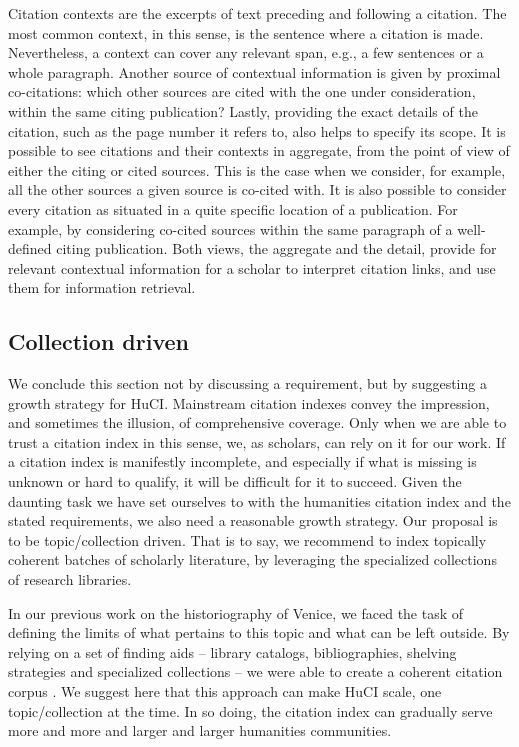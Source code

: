 Citation contexts are the excerpts of text preceding and following a citation. The most common context, in this sense, is the sentence where a citation is made. Nevertheless, a context can cover any relevant span, e.g., a few sentences or a whole paragraph. Another source of contextual information is given by proximal co-citations: which other sources are cited with the one under consideration, within the same citing publication? Lastly, providing the exact details of the citation, such as the page number it refers to, also helps to specify its scope. It is possible to see citations and their contexts in aggregate, from the point of view of either the citing or cited sources. This is the case when we consider, for example, all the other sources a given source is co-cited with. It is also possible to consider every citation as situated in a quite specific location of a publication. For example, by considering co-cited sources within the same paragraph of a well-defined citing publication. Both views, the aggregate and the detail, provide for relevant contextual information for a scholar to interpret citation links, and use them for information retrieval.

\subsection{Collection driven}
We conclude this section not by discussing a requirement, but by suggesting a growth strategy for HuCI. Mainstream citation indexes convey the impression, and sometimes the illusion, of comprehensive coverage. Only when we are able to trust a citation index in this sense, we, as scholars, can rely on it for our work. If a citation index is manifestly incomplete, and especially if what is missing is unknown or hard to qualify, it will be difficult for it to succeed. Given the daunting task we have set ourselves to with the humanities citation index and the stated requirements, we also need a reasonable growth strategy. Our proposal is to be topic/collection driven. That is to say, we recommend to index topically coherent batches of scholarly literature, by leveraging the specialized collections of research libraries.
 
In our previous work on the historiography of Venice, we faced the task of defining the limits of what pertains to this topic and what can be left outside. By relying on a set of finding aids – library catalogs, bibliographies, shelving strategies and specialized collections – we were able to create a coherent citation corpus \cite{colavizza_references_2018}. We suggest here that this approach can make HuCI scale, one topic/collection at the time. In so doing, the citation index can gradually serve more and more and larger and larger humanities communities.

